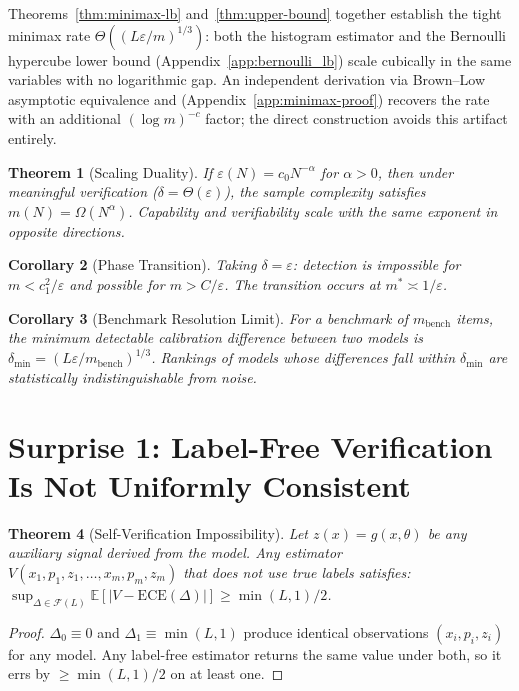 \documentclass{article}
\newcommand{\ECE}{\mathrm{ECE}}
\newcommand{\cF}{\mathcal{F}}
\newcommand{\Lip}{L}
\newcommand{\errrate}{\varepsilon}
\newcommand{\nsamples}{m}
\newcommand{\calmap}{\Delta}
\providecommand{\E}{}
\renewcommand{\E}{\mathbb{E}}
\newcommand{\targetacc}{\delta}
\newcommand{\modelsize}{N}
\newcommand{\scalingexp}{\alpha}
\newtheorem{theorem}{Theorem}
\newtheorem{corollary}[theorem]{Corollary}
\theoremstyle{definition}
\begin{document}
Theorems~\ref{thm:minimax-lb} and~\ref{thm:upper-bound} together establish the tight minimax rate $\Theta((\Lip\errrate/\nsamples)^{1/3})$: both the histogram estimator and the Bernoulli hypercube lower bound (Appendix~\ref{app:bernoulli_lb}) scale cubically in the same variables with no logarithmic gap. An independent derivation via Brown--Low asymptotic equivalence and \citet{lepski1999estimation} (Appendix~\ref{app:minimax-proof}) recovers the rate with an additional $(\log\nsamples)^{-c}$ factor; the direct construction avoids this artifact entirely.

\begin{theorem}[Scaling Duality]
\label{thm:duality}
If $\errrate(\modelsize) = c_0 \modelsize^{-\scalingexp}$ for $\scalingexp > 0$, then under meaningful verification ($\targetacc = \Theta(\errrate)$), the sample complexity satisfies $\nsamples(\modelsize) = \Omega(\modelsize^\scalingexp)$. Capability and verifiability scale with the same exponent in opposite directions.
\end{theorem}

\begin{corollary}[Phase Transition]
\label{cor:phase-transition}
Taking $\targetacc = \errrate$: detection is impossible for $\nsamples < c_1^2/\errrate$ and possible for $\nsamples > C/\errrate$. The transition occurs at $\nsamples^* \asymp 1/\errrate$.
\end{corollary}

\begin{corollary}[Benchmark Resolution Limit]
\label{cor:resolution}
For a benchmark of $m_{\mathrm{bench}}$ items, the minimum detectable calibration difference between two models is $\targetacc_{\min} = (\Lip\errrate/m_{\mathrm{bench}})^{1/3}$. Rankings of models whose differences fall within $\targetacc_{\min}$ are statistically indistinguishable from noise.
\end{corollary}

\section{Surprise 1: Label-Free Verification Is Not Uniformly Consistent}
\label{sec:surprise1}

\begin{theorem}[Self-Verification Impossibility]
\label{thm:selfverify}
Let $z(x) = g(x, \theta)$ be any auxiliary signal derived from the model. Any estimator $V(x_1, p_1, z_1, \ldots, x_\nsamples, p_\nsamples, z_\nsamples)$ that does not use true labels satisfies:
$\sup_{\calmap \in \cF(\Lip)} \E[|V - \ECE(\calmap)|] \geq \min(\Lip, 1)/2$.
\end{theorem}
\begin{proof}
$\calmap_0 \equiv 0$ and $\calmap_1 \equiv \min(\Lip,1)$ produce identical observations $(x_i, p_i, z_i)$ for any model. Any label-free estimator returns the same value under both, so it errs by $\geq \min(\Lip,1)/2$ on at least one.
\end{proof}
\end{document}
